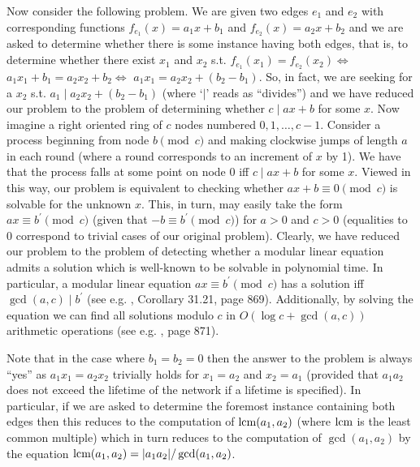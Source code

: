 \documentclass[oribibl, 11pt]{llncs}
\newcommand{\lra}{\Leftrightarrow}
\DeclareMathOperator{\lcm}{\textup{lcm}}
\begin{document}
Now consider the following problem. We are given two edges $e_1$ and $e_2$ with corresponding functions $f_{e_1}(x)=a_1x+b_1$ and $f_{e_2}(x)=a_2x+b_2$ and we are asked to determine whether there is some instance having both edges, that is, to determine whether there exist $x_1$ and $x_2$ s.t. $f_{e_1}(x_1)=f_{e_2}(x_2)\lra$ $a_1x_1+b_1=a_2x_2+b_2\lra$ $a_1x_1=a_2x_2+(b_2-b_1)$. So, in fact, we are seeking for a $x_2$ s.t. $a_1\mid a_2x_2+(b_2-b_1)$ (where `$\mid$' reads as ``divides'') and we have reduced our problem to the problem of determining whether $c\mid ax+b$ for some $x$. Now imagine a right oriented ring of $c$ nodes numbered $0,1,\ldots,c-1$. Consider a process beginning from node $b \pmod c$ and making clockwise jumps of length $a$ in each round (where a round corresponds to an increment of $x$ by 1). We have that the process falls at some point on node $0$ iff $c\mid ax+b$ for some $x$. Viewed in this way, our problem is equivalent to checking whether $ax+b\equiv 0 \pmod c$ is solvable for the unknown $x$. This, in turn, may easily take the form $ax\equiv b^\prime \pmod c$ (given that $-b\equiv b^\prime \pmod c$) for $a>0$ and $c>0$ (equalities to 0 correspond to trivial cases of our original problem). Clearly, we have reduced our problem to the problem of detecting whether a modular linear equation admits a solution which is well-known to be solvable in polynomial time. In particular, a modular linear equation $ax\equiv b^\prime \pmod c$ has a solution iff $\gcd(a,c)\mid b^\prime$ (see e.g. \cite{CLRS01}, Corollary 31.21, page 869). Additionally, by solving the equation we can find all solutions modulo $c$ in $O(\log c + \gcd(a,c))$ arithmetic operations (see e.g. \cite{CLRS01}, page 871).

Note that in the case where $b_1=b_2=0$ then the answer to the problem is always ``yes'' as $a_1x_1=a_2x_2$ trivially holds for $x_1=a_2$ and $x_2=a_1$ (provided that $a_1a_2$ does not exceed the lifetime of the network if a lifetime is specified). In particular, if we are asked to determine the foremost instance containing both edges then this reduces to the computation of $\lcm(a_1,a_2)$ (where $\lcm$ is the least common multiple) which in turn reduces to the computation of $\gcd(a_1,a_2)$ by the equation $\lcm(a_1,a_2)=|a_1a_2|/\gcd(a_1,a_2)$. 
\end{document}

